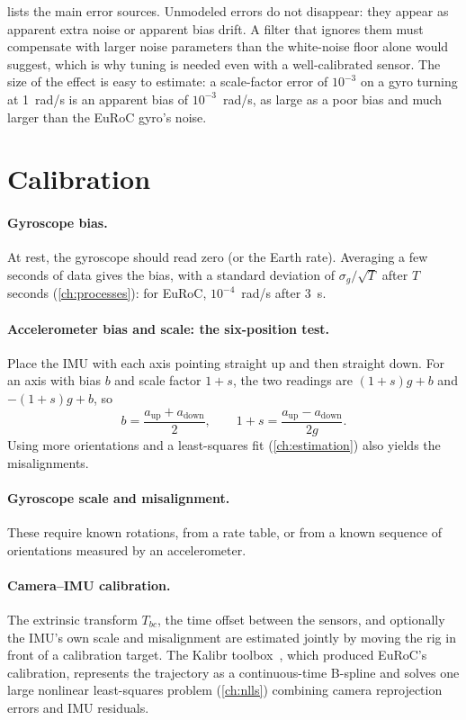  lists the main error sources. Unmodeled errors do not disappear: they appear as apparent extra noise or apparent bias drift. A filter
that ignores them must compensate with larger noise parameters than the white-noise floor alone would suggest, which is why tuning is needed even with a
well-calibrated sensor. The size of the effect is easy to estimate: a scale-factor error of $10^{-3}$ on a gyro turning at 1~rad/s is an apparent bias of
$10^{-3}$~rad/s, as large as a poor bias and much larger than the EuRoC gyro's noise.

\section{Calibration}

\paragraph{Gyroscope bias.} At rest, the gyroscope should read zero (or the Earth rate). Averaging a few seconds of data gives the bias, with a standard
deviation of $\sigma_g/\sqrt T$ after $T$ seconds (\cref{ch:processes}): for EuRoC, $10^{-4}$~rad/s after 3~s.

\paragraph{Accelerometer bias and scale: the six-position test.} Place the IMU with each axis pointing straight up and then straight down. For an axis with
bias $b$ and scale factor $1 + s$, the two readings are $(1 + s)g + b$ and $-(1 + s)g + b$, so
\begin{equation}
  b = \frac{a_{\mathrm{up}} + a_{\mathrm{down}}}{2}, \qquad 1 + s = \frac{a_{\mathrm{up}} - a_{\mathrm{down}}}{2g} .
\end{equation}
Using more orientations and a least-squares fit (\cref{ch:estimation}) also yields the misalignments.

\paragraph{Gyroscope scale and misalignment.} These require known rotations, from a rate table, or from a known sequence of orientations measured by an
accelerometer.

\paragraph{Camera--IMU calibration.} The extrinsic transform $T_{bc}$, the time offset between the sensors, and optionally the IMU's own scale and misalignment
are estimated jointly by moving the rig in front of a calibration target. The Kalibr toolbox~\cite{furgale2013kalibr}, which produced EuRoC's calibration,
represents the trajectory as a continuous-time B-spline and solves one large nonlinear least-squares problem (\cref{ch:nlls}) combining camera
reprojection errors and IMU residuals.

